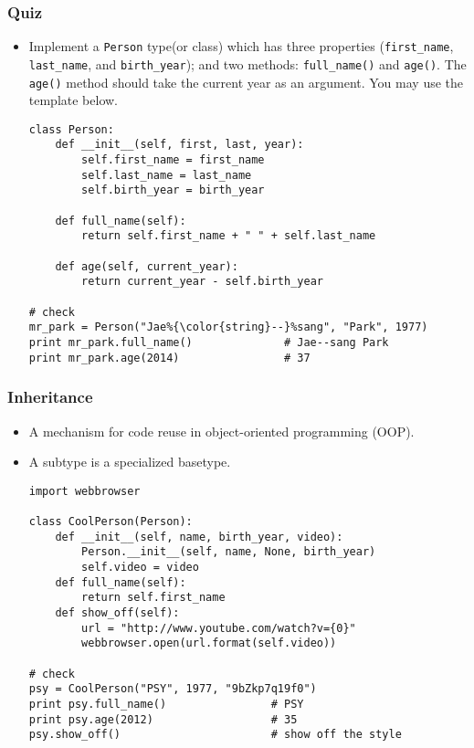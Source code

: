 \documentclass{beamer}
\begin{document}
\begin{frame}[fragile]
\frametitle{Quiz}
\begin{itemize}
\item Implement a \lstinline{Person} type(or class) which has
      three properties (\lstinline{first_name},
      \lstinline{last_name}, and \lstinline{birth_year});
      and two methods: \lstinline{full_name()} and
      \lstinline{age()}. The \lstinline{age()} method
      should take the current year
      as an argument. You may use the template below. 
\begin{lstlisting}[escapechar=\%]
class Person:
    def __init__(self, first, last, year):
        self.first_name = first_name
        self.last_name = last_name
        self.birth_year = birth_year

    def full_name(self):
        return self.first_name + " " + self.last_name

    def age(self, current_year):
        return current_year - self.birth_year

# check
mr_park = Person("Jae%{\color{string}--}%sang", "Park", 1977)
print mr_park.full_name()              # Jae--sang Park
print mr_park.age(2014)                # 37 
\end{lstlisting}
\end{itemize}
\end{frame}

\begin{frame}[fragile]
\frametitle{Inheritance}
\begin{itemize}
\item A mechanism for code reuse in object-oriented
      programming (OOP).
\item A subtype is a specialized basetype.
\begin{lstlisting}
import webbrowser

class CoolPerson(Person):
    def __init__(self, name, birth_year, video):
        Person.__init__(self, name, None, birth_year)
        self.video = video
    def full_name(self):
        return self.first_name
    def show_off(self):
        url = "http://www.youtube.com/watch?v={0}"
        webbrowser.open(url.format(self.video))   

# check
psy = CoolPerson("PSY", 1977, "9bZkp7q19f0")
print psy.full_name()                # PSY
print psy.age(2012)                  # 35
psy.show_off()                       # show off the style
\end{lstlisting}
\end{itemize}
\end{frame}
\end{document}
